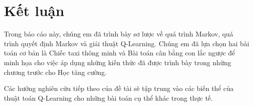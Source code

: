 \chapter{Kết luận}
\label{ch:conc}

Trong báo cáo này, chúng em đã trình bày sơ lược về quá trình Markov,
quá trình quyết định Markov và giải thuật Q-Learning.
Chúng em đã lựa chọn hai bài toán cơ bản là Chiếc taxi thông minh
và Bài toán cân bằng con lắc ngược để minh họa cho
việc áp dụng những kiến thức đã được trình bày
trong những chương trước cho Học tăng cường.

Các hướng nghiên cứu tiếp theo của đề tài sẽ tập trung vào
các biến thể của thuật toán Q-Learning
cho những bài toán cụ thể khác trong thực tế.